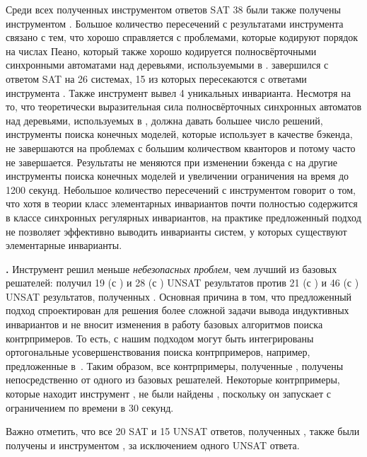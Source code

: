 Среди всех полученных инструментом \eldarica{} ответов SAT 38 были также получены инструментом \ringenSync{}.
Большое количество пересечений с результатами инструмента \eldarica{} связано с тем, что \eldarica{} хорошо справляется с проблемами, которые кодируют порядок на числах Пеано, который также хорошо кодируется полносвёрточными синхронными автоматами над деревьями, используемыми в \ringenSync{}. \racer{} завершился с ответом SAT на 26 системах, 15 из которых пересекаются с ответами инструмента \ringenSync{}. Также инструмент \ringenSync{} вывел 4 уникальных инварианта. Несмотря на то, что теоретически выразительная сила полносвёрточных синхронных автоматов над деревьями, используемых в \ringenSync{}, должна давать большее число решений, инструменты поиска конечных моделей, которые \ringenSync{} использует в качестве бэкенда, не завершаются на проблемах с большим количеством кванторов и потому \ringenSync{} часто не завершается.
Результаты не меняются при изменении бэкенда с \cvc{} на другие инструменты поиска конечных моделей и увеличении ограничения на время до 1200 секунд. Небольшое количество пересечений с инструментом \racer{} говорит о том, что хотя в теории класс элементарных инвариантов почти полностью содержится в классе синхронных регулярных инвариантов, на практике предложенный подход не позволяет эффективно выводить инварианты систем, у которых существуют элементарные инварианты.

\textbf{\theringenCICI{}.} Инструмент \theringenCICI{} решил меньше \textit{небезопасных проблем}, чем лучший из базовых решателей: \theringenCICI{} получил 19 (с \cvc{}) и 28 (с \vampire{}) UNSAT результатов против 21 (с \cvc{}) и 46 (с \vampire{}) UNSAT результатов, полученных \theringen{}. Основная причина в том, что предложенный подход спроектирован для решения более сложной задачи вывода индуктивных инвариантов и не вносит изменения в работу базовых алгоритмов поиска контрпримеров. То есть, с нашим подходом могут быть интегрированы ортогональные усовершенствования поиска контрпримеров, например, предложенные в~\cite{blicha2022transition}. Таким образом, все контрпримеры, полученные \theringenCICI{}, получены непосредственно от одного из базовых решателей. Некоторые контрпримеры, которые находит инструмент \theringen{}, не были найдены \theringenCICI{}, поскольку он запускает \theringen{} с ограничением по времени в 30 секунд. 

Важно отметить, что все 20 SAT и 15 UNSAT ответов, полученных \racer{}, также были получены и инструментом \theringenCICI{}, за исключением одного UNSAT ответа.


